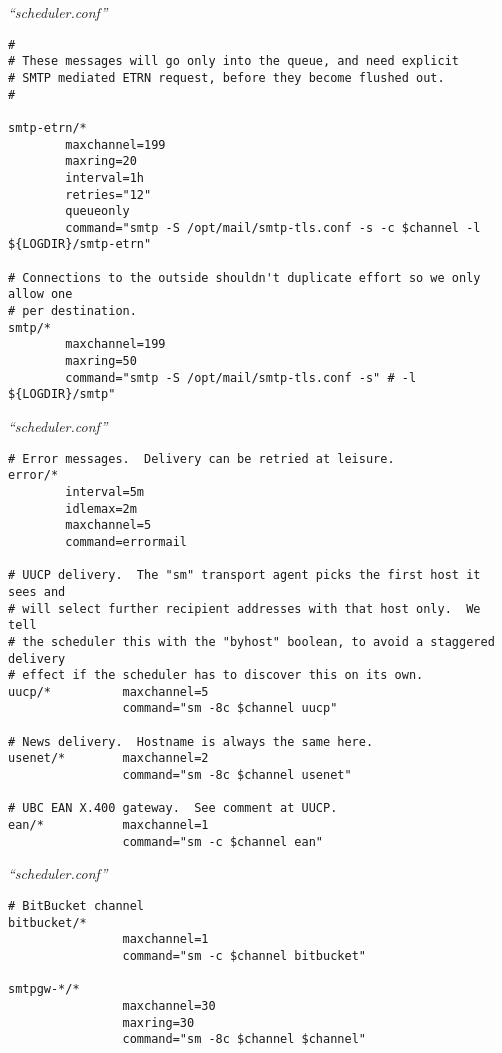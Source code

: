 \documentclass[a4paper,landscape]{slides}
\begin{document}
\begin{overlay}
\small
\centerline{{\em ``scheduler.conf''}}
\tiny
\begin{verbatim}
#
# These messages will go only into the queue, and need explicit
# SMTP mediated ETRN request, before they become flushed out.
#

smtp-etrn/*
        maxchannel=199
        maxring=20
        interval=1h
        retries="12"
        queueonly
        command="smtp -S /opt/mail/smtp-tls.conf -s -c $channel -l ${LOGDIR}/smtp-etrn"

# Connections to the outside shouldn't duplicate effort so we only allow one
# per destination.
smtp/*
        maxchannel=199
        maxring=50
        command="smtp -S /opt/mail/smtp-tls.conf -s" # -l ${LOGDIR}/smtp"
\end{verbatim}
\vfill
\end{overlay}
\begin{overlay}
\small
\centerline{{\em ``scheduler.conf''}}
\tiny
\begin{verbatim}
# Error messages.  Delivery can be retried at leisure.
error/*
        interval=5m
        idlemax=2m
        maxchannel=5
        command=errormail

# UUCP delivery.  The "sm" transport agent picks the first host it sees and
# will select further recipient addresses with that host only.  We tell
# the scheduler this with the "byhost" boolean, to avoid a staggered delivery
# effect if the scheduler has to discover this on its own.
uucp/*          maxchannel=5
                command="sm -8c $channel uucp"

# News delivery.  Hostname is always the same here.
usenet/*        maxchannel=2
                command="sm -8c $channel usenet"

# UBC EAN X.400 gateway.  See comment at UUCP.
ean/*           maxchannel=1
                command="sm -c $channel ean"
\end{verbatim}
\vfill
\end{overlay}
\begin{overlay}
\small
\centerline{{\em ``scheduler.conf''}}
\tiny
\begin{verbatim}
# BitBucket channel
bitbucket/*
                maxchannel=1
                command="sm -c $channel bitbucket"

smtpgw-*/*
                maxchannel=30
                maxring=30
                command="sm -8c $channel $channel"
\end{verbatim}
\vfill
\end{overlay}
\end{document}
